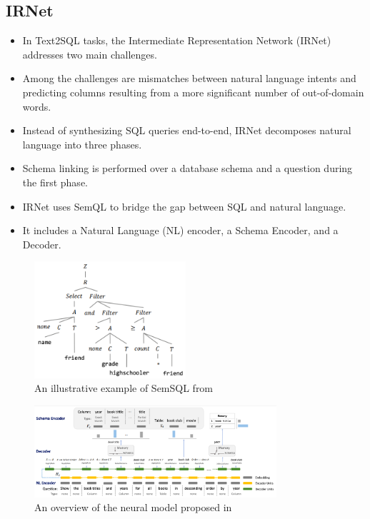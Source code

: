\subsection*{IRNet}

\begin{itemize}
    \item In Text2SQL tasks, the Intermediate Representation Network (IRNet) addresses two main challenges.
    \item Among the challenges are mismatches between natural language intents and predicting columns resulting from a more significant number of out-of-domain words.
    \item Instead of synthesizing SQL queries end-to-end, IRNet decomposes natural language into three phases.
    \item Schema linking is performed over a database schema and a question during the first phase.
    \item IRNet uses SemQL to bridge the gap between SQL and natural language.
    \item It includes a Natural Language (NL) encoder, a Schema Encoder, and a Decoder.
\end{itemize}

\begin{figure}[htb]
    \centering
    \includegraphics[width=0.5\textwidth]{pics/IRNet/illustrative_SemSQL}
    \caption{An illustrative example of SemSQL from \cite{DBLP:journals/corr/abs-1905-08205}}
    \label{fig:illustrative_SemSQL}
\end{figure}

\begin{figure}[htb]
    \centering
    \includegraphics[width=0.8\textwidth]{pics/IRNet/overview}
    \caption{An overview of the neural model proposed in \cite{DBLP:journals/corr/abs-1905-08205}}
    \label{fig:overview}
\end{figure}

